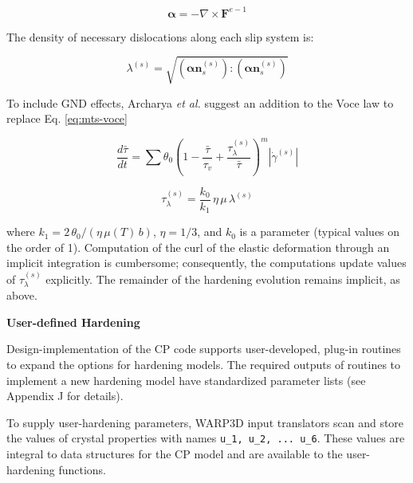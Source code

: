 \documentclass[11pt]{report}
\numberwithin{equation}{section}
\newcommand{\ttt} {\texttt}  %
\newcommand{\noi}{\noindent}
\begin{document}
\begin{equation}
\bm{\alpha}=-\nabla\times\mathbf{F}^{e-1}
\label{eq:Nye-tensor}
\end{equation}


\noindent The density of necessary dislocations along each slip system is:

\begin{equation}
\lambda^{\left(s\right)}=\sqrt{\left(\bm{\alpha}\mathbf{n}_{s}^
{\left(s\right)}\right):\left(\bm{\alpha}\mathbf{n}_{s}^{\left(s\right)}\right)}
\label{eq:lambda-Nye}
\end{equation}

\noindent To include GND effects, Archarya \emph{et al.} suggest an addition to the Voce law
to replace Eq. \ref{eq:mts-voce}

\begin{equation}
\frac{d\bar{\tau}}{dt}=\sum\theta_{0}\left (  1-\frac{\bar{\tau}}{\tau_{v}}+
\frac{\tau_{\lambda}^{\left(s\right)}}{\bar{\tau}}\right )^m
\left|\dot{\gamma}^{\left(s\right)}\right|\label{eq:voce-with-geom}
\end{equation}

\begin{equation}
\tau_{\lambda}^{\left(s\right)}=\frac{k_{0}}{k_{1}}\,\eta\,\mu\,\lambda^{\left(s\right)}\label{eq:t-lamba}
\end{equation}


\noindent where $k_{1} = 2\,\theta_{0}/\left(\eta\,\mu(T)\,b\right)$,
$\eta=1/3$, and $k_{0}$ is a parameter (typical values
on the order of 1). Computation of the curl of the elastic deformation
through an implicit integration is cumbersome; consequently, the
computations update values of
$\tau_{\lambda}^{\left(s\right)}$ explicitly. The remainder
of the hardening evolution remains implicit, as above.

\noi \textbf {User-defined Hardening} 


\noi Design-implementation of the CP code supports user-developed, plug-in routines
to expand the options for hardening models.  The required outputs of  routines to implement
a new hardening model have  standardized parameter lists (see Appendix J for details).

To supply user-hardening parameters, WARP3D input translators scan and store the values
of crystal properties with names \ttt{u\_1, u\_2, ... u\_6}. These values are integral to data structures
for the CP model and are available to the user-hardening functions.
\end{document}
